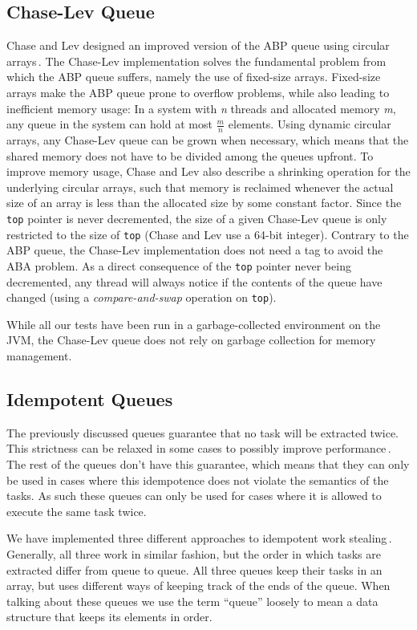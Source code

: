 \subsection{Chase-Lev Queue}
Chase and Lev designed an improved version of the ABP queue using circular arrays\,\citep{ChaseLev05}. The Chase-Lev implementation solves the fundamental problem from which the ABP queue suffers, namely the use of fixed-size arrays. Fixed-size arrays make the ABP queue prone to overflow problems, while also leading to inefficient memory usage: In a system with \emph{n} threads and allocated memory \emph{m}, any queue in the system can hold at most $\frac{m}{n}$ elements. Using dynamic circular arrays, any Chase-Lev queue can be grown when necessary, which means that the shared memory does not have to be divided among the queues upfront. To improve memory usage, Chase and Lev also describe a shrinking operation for the underlying circular arrays, such that memory is reclaimed whenever the actual size of an array is less than the allocated size by some constant factor. Since the \texttt{top} pointer is never decremented, the size of a given Chase-Lev queue is only restricted to the size of \texttt{top} (Chase and Lev use a 64-bit integer). Contrary to the ABP queue, the Chase-Lev implementation does not need a tag to avoid the ABA problem. As a direct consequence of the \texttt{top} pointer never being decremented, any thread will always notice if the contents of the queue have changed (using a \emph{compare-and-swap} operation on \texttt{top}).

While all our tests have been run in a garbage-collected environment on the JVM, the Chase-Lev queue does not rely on garbage collection for memory management.

\subsection{Idempotent Queues}
The previously discussed queues guarantee that no task will be extracted twice. This strictness can be relaxed in some cases to possibly improve performance\,\cite[p. 46]{Michael:2009:IWS:1594835.1504186}. The rest of the queues don't have this guarantee, which means that they can only be used in cases where this idempotence does not violate the semantics of the tasks. As such these queues can only be used for cases where it is allowed to execute the same task twice.

We have implemented three different approaches to idempotent work stealing\,\cite{Michael:2009:IWS:1594835.1504186}. Generally, all three work in similar fashion, but the order in which tasks are extracted differ from queue to queue. All three queues keep their tasks in an array, but uses different ways of keeping track of the ends of the queue. When talking about these queues we use the term ``queue'' loosely to mean a data structure that keeps its elements in order.

